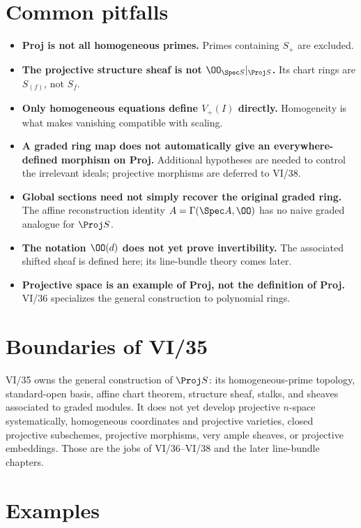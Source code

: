 

\section{Common pitfalls}
\begin{itemize}
\item \textbf{Proj is not all homogeneous primes.}  Primes containing \(S_+\) are excluded.
\item \textbf{The projective structure sheaf is not \(\OO_{\Spec S}|_{\Proj S}\).}  Its chart rings are \(S_{(f)}\), not \(S_f\).
\item \textbf{Only homogeneous equations define \(V_+(I)\) directly.}  Homogeneity is what makes vanishing compatible with scaling.
\item \textbf{A graded ring map does not automatically give an everywhere-defined morphism on Proj.}  Additional hypotheses are needed to control the irrelevant ideals; projective morphisms are deferred to VI/38.
\item \textbf{Global sections need not simply recover the original graded ring.}  The affine reconstruction identity \(A=\Gamma(\Spec A,\OO)\) has no naive graded analogue for \(\Proj S\).
\item \textbf{The notation \(\OO(d)\) does not yet prove invertibility.}  The associated shifted sheaf is defined here; its line-bundle theory comes later.
\item \textbf{Projective space is an example of Proj, not the definition of Proj.}  VI/36 specializes the general construction to polynomial rings.
\end{itemize}

\section{Boundaries of VI/35}
VI/35 owns the general construction of \(\Proj S\): its homogeneous-prime topology, standard-open basis, affine chart theorem, structure sheaf, stalks, and sheaves associated to graded modules.  It does not yet develop projective \(n\)-space systematically, homogeneous coordinates and projective varieties, closed projective subschemes, projective morphisms, very ample sheaves, or projective embeddings.  Those are the jobs of VI/36--VI/38 and the later line-bundle chapters.

\section{Examples}


